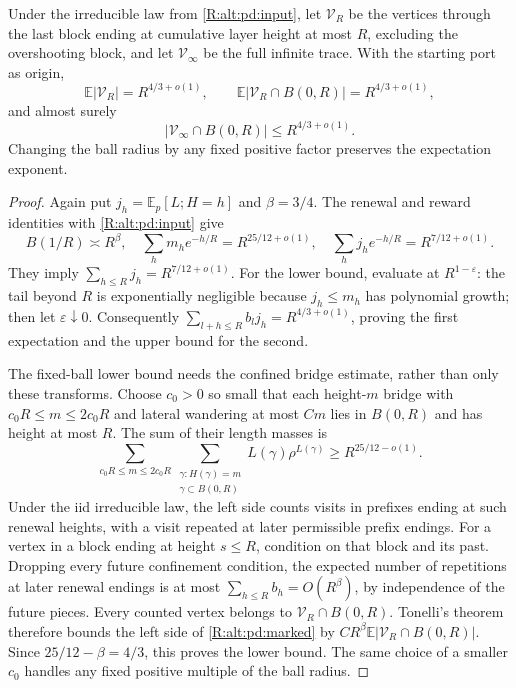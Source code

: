 \begin{proposition}
\label{R:alt:pd:prefix}
Under the irreducible law from \eqref{R:alt:pd:input}, let
$\mathcal V_R$ be the vertices through the last block ending at cumulative
layer height at most $R$, excluding the overshooting block, and let
$\mathcal V_\infty$ be the full infinite trace.  With the starting port as
origin,
\[
 \mathbb E|\mathcal V_R|=R^{4/3+o(1)},\qquad
 \mathbb E|\mathcal V_R\cap B(0,R)|=R^{4/3+o(1)},
\]
and almost surely
\[
 |\mathcal V_\infty\cap B(0,R)|\le R^{4/3+o(1)}.
\]
Changing the ball radius by any fixed positive factor preserves the
expectation exponent.
\end{proposition}
\begin{proof}
Again put $j_h=\mathbb E_p[L;H=h]$ and $\beta=3/4$.
The renewal and reward identities with \eqref{R:alt:pd:input} give
\[
 B(1/R)\asymp R^\beta,\quad
 \sum_hm_he^{-h/R}=R^{25/12+o(1)},\quad
 \sum_hj_he^{-h/R}=R^{7/12+o(1)}.
\]
They imply $\sum_{h\le R}j_h=R^{7/12+o(1)}$.
For the lower bound, evaluate at $R^{1-\varepsilon}$: the tail beyond $R$
is exponentially negligible because $j_h\le m_h$ has polynomial growth;
then let $\varepsilon\downarrow0$.
Consequently $\sum_{l+h\le R}b_lj_h=R^{4/3+o(1)}$, proving the first
expectation and the upper bound for the second.

The fixed-ball lower bound needs the confined bridge estimate, rather than
only these transforms.  Choose $c_0>0$ so small that each height-$m$ bridge
with $c_0R\le m\le2c_0R$ and lateral wandering at most $Cm$ lies in
$B(0,R)$ and has height at most $R$.  The sum of their length masses is
\begin{equation}\label{R:alt:pd:marked}
 \sum_{c_0R\le m\le2c_0R}
   \sum_{\substack{\gamma:H(\gamma)=m\\\gamma\subset B(0,R)}}
       L(\gamma)\rho^{L(\gamma)}
 \ge R^{25/12-o(1)}.
\end{equation}
Under the iid irreducible law, the left side counts visits in prefixes
ending at such renewal heights, with a visit repeated at later permissible
prefix endings.  For a vertex in a block ending at height $s\le R$, condition
on that block and its past.  Dropping every future confinement condition,
the expected number of repetitions at later renewal endings is at most
$\sum_{h\le R}b_h=O(R^\beta)$, by independence of the future pieces.
Every counted vertex belongs to $\mathcal V_R\cap B(0,R)$.
Tonelli's theorem therefore bounds the left side of
\eqref{R:alt:pd:marked} by
$CR^\beta\mathbb E|\mathcal V_R\cap B(0,R)|$.
Since $25/12-\beta=4/3$, this proves the lower bound.  The same choice of a
smaller $c_0$ handles any fixed positive multiple of the ball radius.


\end{proof}
